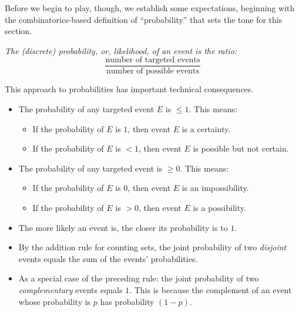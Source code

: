 Before we begin to play, though, we establish some expectations,
beginning with the combinatorics-based definition of ``probability''
that sets the tone for this section.

\bigskip

\noindent
{\em  The (discrete) {\em probability}, or, {\em likelihood}, of an event is the ratio:}
\begin{equation}
\label{eq:prob-def-ratio}
\frac{\mbox{number of targeted events}}{\mbox{number of possible events}}
\end{equation}

\noindent
This approach to probabilities has important technical consequences.
  \begin{itemize}
  \item
The probability of any targeted event $E$ is $\leq 1$.  This means:
    \begin{itemize}
    \item
If the probability of $E$ is $1$, then event $E$ is a certainty.
    \item
If the probability of $E$ is $< 1$, then event $E$ is possible but not certain.
   \end{itemize}

 \item
The probability of any targeted event is $\geq 0$.   This means:
    \begin{itemize}
    \item
If the probability of $E$ is $0$, then event $E$ is an impossibility.
    \item
If the probability of $E$ is $> 0$, then event $E$ is a possibility.
   \end{itemize}

  \item
The more likely an event is, the closer its probability is to $1$.
  \item
By the addition rule for counting sets, the joint probability of two {\em disjoint} events
equals the sum of the events' probabilities.
  \item
As a special case of the preceding rule: the joint probability of two {\em complementary} events
equals $1$.  This is because the complement of an event whose probability is $p$ has
probability  $(1-p)$.
  \end{itemize}

\bigskip

